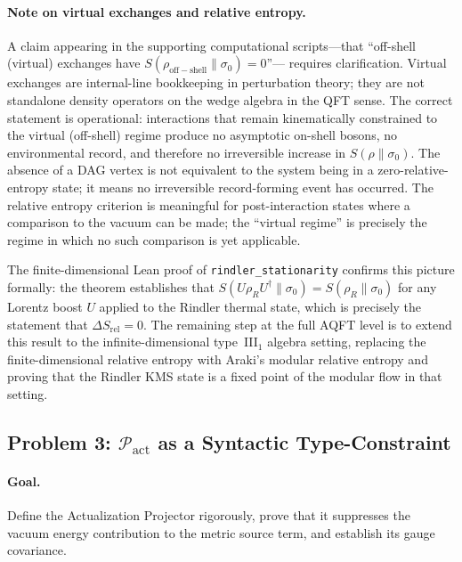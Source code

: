\documentclass[11pt,a4paper]{article}
\theoremstyle{plain}
\theoremstyle{definition}
\theoremstyle{remark}
\newcommand{\Pact}{\mathcal{P}_{\mathrm{act}}}
\begin{document}
\paragraph{Note on virtual exchanges and relative entropy.}
A claim appearing in the supporting computational scripts---that ``off-shell
(virtual) exchanges have $S(\rho_{\mathrm{off-shell}} \| \sigma_0) = 0$''---
requires clarification. Virtual exchanges are internal-line bookkeeping
in perturbation theory; they are not standalone density operators on the
wedge algebra in the QFT sense. The correct statement is operational: interactions
that remain kinematically constrained to the virtual (off-shell) regime produce
no asymptotic on-shell bosons, no environmental record, and therefore no
irreversible increase in $S(\rho \| \sigma_0)$. The absence of a DAG vertex
is not equivalent to the system being in a zero-relative-entropy state; it means
no irreversible record-forming event has occurred. The relative entropy criterion
is meaningful for post-interaction states where a comparison to the vacuum can be
made; the ``virtual regime'' is precisely the regime in which no such comparison
is yet applicable.

The finite-dimensional Lean proof of \texttt{rindler\_stationarity} confirms this
picture formally: the theorem establishes that $S(U\rho_R U^\dagger \| \sigma_0) =
S(\rho_R \| \sigma_0)$ for any Lorentz boost $U$ applied to the Rindler thermal
state, which is precisely the statement that $\Delta S_{\mathrm{rel}} = 0$.
The remaining step at the full AQFT level is to extend this result to the
infinite-dimensional type~III$_1$ algebra setting, replacing the finite-dimensional
relative entropy with Araki's modular relative entropy and proving that the Rindler
KMS state is a fixed point of the modular flow in that setting.

\subsection{Problem 3: \texorpdfstring{$\Pact$}{P\_act} as a Syntactic Type-Constraint}
\label{sec:pact}

\paragraph{Goal.} Define the Actualization Projector rigorously, prove that it
suppresses the vacuum energy contribution to the metric source term, and establish
its gauge covariance.
\end{document}
